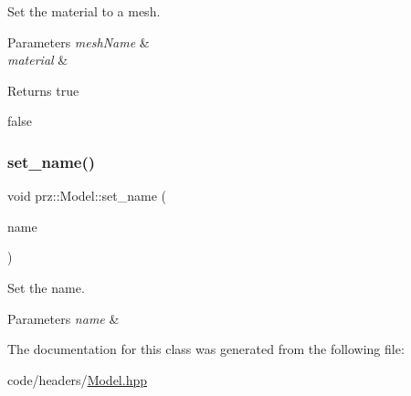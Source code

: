 Set the material to a mesh. 


\begin{DoxyParams}{Parameters}
{\em mesh\+Name} & \\
\hline
{\em material} & \\
\hline
\end{DoxyParams}
\begin{DoxyReturn}{Returns}
true 

false 
\end{DoxyReturn}
\mbox{\label{classprz_1_1_model_a553159d0e6db23fa478e2c84ddc20358}} 
\subsubsection{\texorpdfstring{set\_name()}{set\_name()}}
{\footnotesize\ttfamily void prz\+::\+Model\+::set\+\_\+name (\begin{DoxyParamCaption}\item[{const P\+String \&}]{name }\end{DoxyParamCaption})\hspace{0.3cm}{\ttfamily [inline]}}



Set the name. 


\begin{DoxyParams}{Parameters}
{\em name} & \\
\hline
\end{DoxyParams}


The documentation for this class was generated from the following file\+:\begin{DoxyCompactItemize}
\item 
code/headers/\mbox{\hyperlink{_model_8hpp}{Model.\+hpp}}\end{DoxyCompactItemize}
